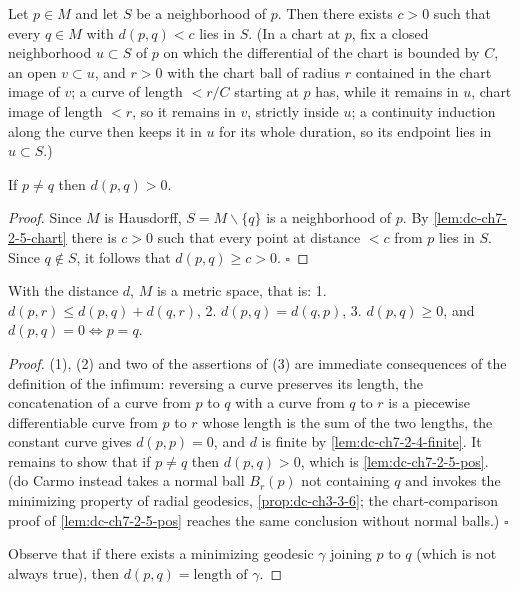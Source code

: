 \begin{lemma}
  \label{lem:dc-ch7-2-5-chart}
  \mathlibok
  Let $p\in M$ and let $S$ be a neighborhood of $p$. Then there exists $c>0$
  such that every $q\in M$ with $d(p,q)<c$ lies in $S$. (In a chart at $p$,
  fix a closed neighborhood $u\subset S$ of $p$ on which the differential of
  the chart is bounded by $C$, an open $v\subset u$, and $r>0$ with the chart
  ball of radius $r$ contained in the chart image of $v$; a curve of length
  $<r/C$ starting at $p$ has, while it remains in $u$, chart image of length
  $<r$, so it remains in $v$, strictly inside $u$; a continuity induction
  along the curve then keeps it in $u$ for its whole duration, so its
  endpoint lies in $u\subset S$.)
\end{lemma}

\begin{lemma}
  \label{lem:dc-ch7-2-5-pos}
  \leanok
  If $p\ne q$ then $d(p,q)>0$.
\end{lemma}
\begin{proof}
  \leanok
  Since $M$ is Hausdorff, $S=M\smallsetminus\{q\}$ is a neighborhood of $p$.
  By \cref{lem:dc-ch7-2-5-chart} there is $c>0$ such that every point at
  distance $<c$ from $p$ lies in $S$. Since $q\notin S$, it follows that
  $d(p,q)\ge c>0$. $\square$
\end{proof}

\begin{proposition}[$d$ is a metric]
  \label{prop:dc-ch7-2-5}
  \leanok
  With the distance $d$, $M$ is a metric space, that is:
  1. $d(p,r)\le d(p,q)+d(q,r)$,
  2. $d(p,q)=d(q,p)$,
  3. $d(p,q)\ge 0$, and $d(p,q)=0\iff p=q$.
\end{proposition}
\begin{proof}
  \leanok
  (1), (2) and two of the assertions of (3) are immediate consequences of the
  definition of the infimum: reversing a curve preserves its length, the
  concatenation of a curve from $p$ to $q$ with a curve from $q$ to $r$ is a
  piecewise differentiable curve from $p$ to $r$ whose length is the sum of
  the two lengths, the constant curve gives $d(p,p)=0$, and $d$ is finite by
  \cref{lem:dc-ch7-2-4-finite}. It remains to show that if $p\ne q$ then
  $d(p,q)>0$, which is \cref{lem:dc-ch7-2-5-pos}. (do Carmo instead takes a
  normal ball $B_r(p)$ not containing $q$ and invokes the minimizing property
  of radial geodesics, \cref{prop:dc-ch3-3-6}; the chart-comparison proof of
  \cref{lem:dc-ch7-2-5-pos} reaches the same conclusion without normal
  balls.) $\square$

  Observe that if there exists a minimizing geodesic $\gamma$ joining $p$ to $q$
  (which is not always true), then $d(p,q)=\text{length of }\gamma$.
\end{proof}

